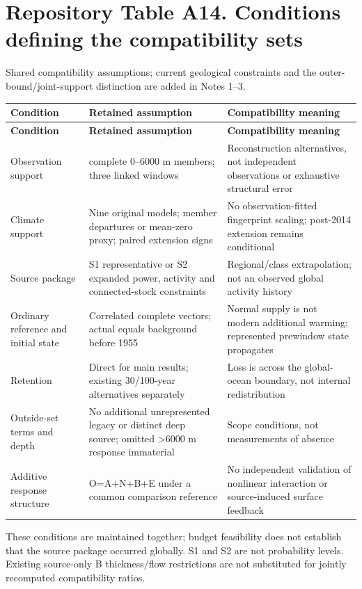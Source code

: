 \documentclass[11pt,a4paper]{article}
\begin{document}
\section*{Repository Table A14. Conditions defining the compatibility sets}
Shared compatibility assumptions; current geological constraints and the outer-bound/\allowbreak{}joint-support distinction are added in Notes 1--3.\par
{\fontsize{8.3}{10.1}\selectfont\begin{longtable}{>{\raggedright\arraybackslash}p{31.093mm}>{\raggedright\arraybackslash}p{63.823mm}>{\raggedright\arraybackslash}p{68.733mm}}\toprule
\textbf{Condition} & \textbf{Retained assumption} & \textbf{Compatibility meaning}\\\midrule\endfirsthead
\textbf{Condition} & \textbf{Retained assumption} & \textbf{Compatibility meaning}\\\midrule\endhead
\bottomrule\endfoot
Observation support & 908 complete 0--6000 m members; three linked windows & Reconstruction alternatives, not independent observations or exhaustive structural error\\
Climate support & Nine original models; member departures or mean-zero proxy; paired extension signs & No observation-fitted fingerprint scaling; post-2014 extension remains conditional\\
Source package & S1 representative or S2 expanded power, activity and connected-stock constraints & Regional/\allowbreak{}class extrapolation; not an observed global activity history\\
Ordinary reference and initial state & Correlated complete vectors; actual equals background before 1955 & Normal supply is not modern additional warming; represented prewindow state propagates\\
Retention & Direct for main results; existing 30/\allowbreak{}100-year alternatives separately & Loss is across the global-ocean boundary, not internal redistribution\\
Outside-set terms and depth & No additional unrepresented legacy or distinct deep source; omitted >6000 m response immaterial & Scope conditions, not measurements of absence\\
Additive response structure & O=A+N+B+E under a common comparison reference & No independent validation of nonlinear interaction or source-induced surface feedback\\
\end{longtable}}
These conditions are maintained together; budget feasibility does not establish that the source package occurred globally. S1 and S2 are not probability levels. Existing source-only B thickness/\allowbreak{}flow restrictions are not substituted for jointly recomputed compatibility ratios.\par
\clearpage
\end{document}
